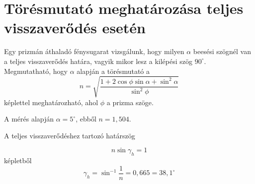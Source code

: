 \documentclass[12pt]{article}
\begin{document}
\section{Törésmutató meghatározása teljes visszaverődés esetén}

Egy prizmán áthaladó fénysugarat vizsgálunk, hogy milyen $\alpha$ beesési szögnél van a teljes visszaverődés határa, vagyik mikor lesz a kilépési szög $90^\circ$. Megmutatható, hogy $\alpha$ alapján a törésmutató a \[ n = \sqrt{\frac{1+2 \cos \phi \sin \alpha + \sin^2 \alpha}{\sin^2 \phi}} \] képlettel meghatározható, ahol $\phi$ a prizma szöge.

A mérés alapján $\alpha = 5^\circ$, ebből $n=\ensuremath{1,504}$.

A teljes visszaverődéshez tartozó határszög

\[n \sin \gamma_h = 1\]
képletből \[\gamma_h = \sin^{-1} \frac 1n = \ensuremath{0,665} = \ensuremath{38,1} ^\circ\]
\end{document}

